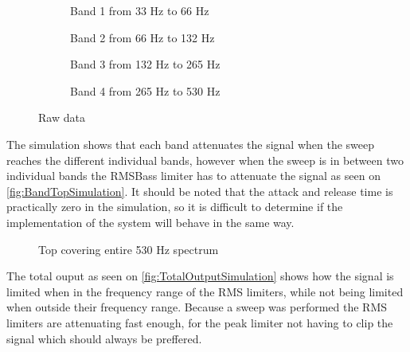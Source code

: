 \begin{figure}[H]
\centering
\begin{subfigure}[t]{0.49\textwidth}
    \centering
    
    \caption{Band 1 from 33 Hz to 66 Hz}
    \label{fig:Band1Simulation}
\end{subfigure}
\begin{subfigure}[t]{0.49\textwidth}
    \centering
    
    \caption{Band 2 from 66 Hz to 132 Hz}
    \label{fig:Band2Simulation}
\end{subfigure}
\begin{subfigure}[t]{0.49\textwidth}
    \centering
    
    \caption{Band 3 from 132 Hz to 265 Hz}
    \label{fig:Band3Simulation}
\end{subfigure}
\begin{subfigure}[t]{0.49\textwidth}
    \centering
    
    \caption{Band 4 from 265 Hz to 530 Hz}
    \label{fig:Band4Simulation}
\end{subfigure}
\caption{Raw data}
\label{fig:SimulationComparisson}
\end{figure} 

The simulation shows that each band attenuates the signal when the sweep reaches the different individual bands, however when the sweep is in between two individual bands the RMSBass limiter has to attenuate the signal as seen on \autoref{fig:BandTopSimulation}. It should be noted that the attack and release time is practically zero in the simulation, so it is difficult to determine if the implementation of the system will behave in the same way. 

\begin{figure}[H]
    \centering
    
    \caption{Top covering entire 530 Hz spectrum}
    \label{fig:BandTopSimulation}
\end{figure}

The total ouput as seen on \autoref{fig:TotalOutputSimulation} shows how the signal is limited when in the frequency range of the RMS limiters, while not being limited when outside their frequency range. Because a sweep was performed the RMS limiters are attenuating fast enough, for the peak limiter not having to clip the signal which should always be preffered.

